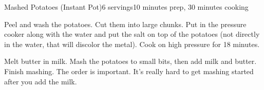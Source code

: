 \documentclass[../Cookbook.tex]{subfiles}
\begin{document}
\begin{recipe}[MashedPotatoesInstantPot]{Mashed Potatoes (Instant Pot)}{6 servings}{10 minutes prep, 30 minutes cooking}

	Peel and wash the potatoes. Cut them into large chunks.
	Put in the pressure cooker along with the water and put the salt on top of the potatoes (not directly in the water, that will discolor the metal).
	Cook on high pressure for 18 minutes.

	Melt butter in milk. Mash the potatoes to small bits, then add milk and butter. Finish mashing.
	The order is important. It's really hard to get mashing started after you add the milk.

\end{recipe}
\end{document}
